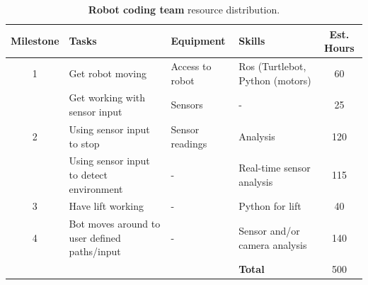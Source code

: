 \documentclass{article}
\begin{document}
\begin{table}[]
  \begin{center}
  \begin{small}
  \begin{tabular}{|c|l|l|l|c|}
    \hline
    {\bf Milestone} & {\bf Tasks} & {\bf Equipment} & {\bf Skills} & {\bf Est. Hours} \\ \hline
    1               & Get robot moving & Access to robot & Ros (Turtlebot, Python (motors) & 60 \\ \cline{2-5}
                    & Get working with sensor input & Sensors & - & 25 \\ \hline
    2               & Using sensor input to stop & Sensor readings & Analysis & 120 \\ \cline{2-5}
                    & Using sensor input to detect environment & - & Real-time sensor analysis & 115 \\ \hline
    3               & Have lift working & - & Python for lift & 40 \\ \hline
    4               & Bot moves around to user defined paths/input & - & Sensor and/or camera analysis & 140 \\ \hline
                    &  &  & {\bf Total} & 500 \\ \hline
  \end{tabular}
  \end{small}
  \caption{{\bf Robot coding team} resource distribution.}
  \end{center}
\end{table}
\end{document}
